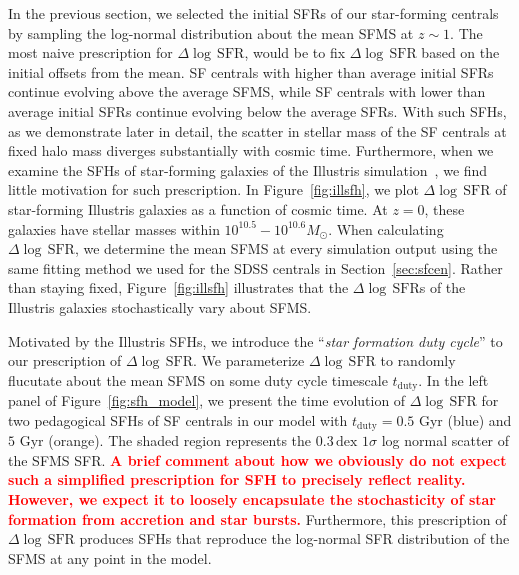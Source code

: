 \documentclass[12pt, letterpaper, preprint]{aastex}
\newcommand{\todo}[1]{{\bf \textcolor{red}{#1}}}
\newcommand{\logsfr}{\log \, \mathrm{SFR}}
\begin{document}
In the previous section, we selected the initial SFRs of our star-forming
centrals by sampling the log-normal distribution about the mean SFMS at 
$z \sim 1$. The most naive prescription for $\Delta \logsfr$, would be to 
fix $\Delta \logsfr$ based on the initial offsets from the mean. SF centrals 
with higher than average initial SFRs continue evolving above the average SFMS, 
while SF centrals with lower than average initial SFRs continue evolving below 
the average SFRs. With such SFHs, as we demonstrate later in detail, the scatter 
in stellar mass of the SF centrals at fixed halo mass diverges substantially 
with cosmic time. Furthermore, when we examine the SFHs of star-forming galaxies
of the Illustris simulation~\cite{vogelsberger2014,genel2014}, we find little
motivation for such prescription. In Figure~\ref{fig:illsfh}, we plot 
$\Delta \logsfr$ of star-forming Illustris galaxies as a function of cosmic time. 
At $z = 0$, these galaxies have stellar masses within $10^{10.5}-10^{10.6}M_\odot$. 
When calculating $\Delta \logsfr$, we determine the mean SFMS  at every 
simulation output using the same fitting method we used for the SDSS centrals 
in Section~\ref{sec:sfcen}. Rather than staying fixed, Figure~\ref{fig:illsfh} 
illustrates that the $\Delta \logsfr$s of the Illustris galaxies stochastically 
vary about SFMS. 

Motivated by the Illustris SFHs, we introduce the ``\emph{star formation 
duty cycle}'' to our prescription of $\Delta \logsfr$. We parameterize 
$\Delta \logsfr$ to randomly flucutate about the mean SFMS on some duty cycle 
timescale $t_\mathrm{duty}$. In the left panel of Figure~\ref{fig:sfh_model}, we 
present the time evolution of $\Delta \logsfr$ for two pedagogical SFHs of SF 
centrals in our model with $t_\mathrm{duty} = 0.5$ Gyr (blue) and $5$ Gyr (orange).  
The shaded region represents the $0.3\,\mathrm{dex}$ $1\sigma$ log normal 
scatter of the SFMS SFR.  
\todo{A brief comment about how we obviously do not expect such a simplified 
prescription for SFH to precisely reflect reality. However, we expect it to 
loosely encapsulate the stochasticity of star formation from accretion and star 
bursts.} Furthermore, this prescription of $\Delta \logsfr$ produces SFHs that 
reproduce the log-normal SFR distribution of the SFMS at any point in the model. 
\end{document}
